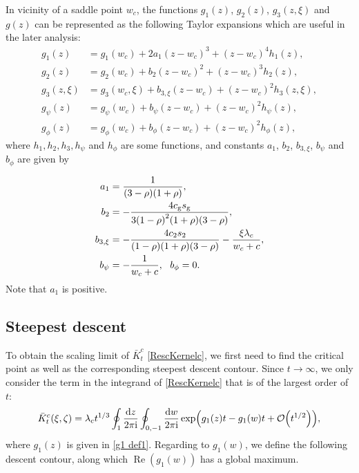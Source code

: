 \documentclass[cmp]{svjour}
\numberwithin{theorem}{section}
\numberwithin{equation}{section}
\def\ii{{\rm i}}
\DeclareMathOperator{\R}{Re}
\begin{document}
In vicinity of a saddle point $w_c$, the functions $g_1(z)$, $g_2(z)$, $g_3(z, \xi)$ and $g(z)$ can be represented as the following Taylor expansions which are useful in the later analysis: 
\begin{subequations}\label{gExpands}
	\begin{align}
		g_1(z) &= g_1(w_c) + 2 a_1 {(z - w_c)}^3 + {(z - w_c)}^4 h_1(z), \label{g1Expand} \\
		g_2(z) & = g_2(w_c) + b_2 {(z - w_c)}^2 + {(z - w_c)}^3 h_2(z), \\
		g_3(z , \xi) & = g_3(w_c , \xi) + b_{3,\xi} {(z - w_c)} + {(z - w_c)}^2 h_3(z, \xi), \\
		g_{\psi}(z) & = g_{\psi}(w_c) + b_{\psi} (z - w_c) + {(z - w_c)}^2 h_{\psi}(z),\\
		g_{\phi}(z) & = g_{\phi}(w_c) + b_{\phi} (z - w_c) + {(z - w_c)}^2 h_{\phi}(z),
	\end{align}
\end{subequations}
where $h_1,h_2,h_3,h_{\psi}$ and $h_{\phi}$ are some functions, and constants $a_1$, $b_2$, $b_{3,\xi}$, $b_{\psi}$ and $b_{\phi}$ are given by

\begin{subequations}\label{gCoefs}
	\begin{align}
		a_1 &= \frac{1}{(3 - \rho)(1 + \rho)}, \label{Defa1} \\
		b_2 &= - \frac{4 c_{\rm g} s_{\rm g}}{3 {(1 - \rho)}^2 (1 + \rho) (3 - \rho) }, \\
		b_{3,\xi} &= - \frac{4 c_2 s_2}{(1 - \rho)(1 + \rho)(3 - \rho)} - \frac{\xi\lambda_c}{w_c+c}, \\
		b_{\psi} &= - \frac{1 }{w_c + c},
		\,\,\,\,
		b_{\phi}=0.
	\end{align}
\end{subequations}
Note that $a_1$ is positive.


\subsection{Steepest descent}\label{Sec:SteepestDesecnt}

To obtain the scaling limit of $\bar{K}^c_t$ \eqref{RescKernelc}, we first need to find the critical point as well as the corresponding steepest descent contour. Since $t\rightarrow\infty$, we only consider the term in the integrand of \eqref{RescKernelc} that is of the largest order of $t$:
\[\bar{K}_t^c(\xi,\zeta)=\lambda_c t^{1/3}
\oint_1 \frac{\mathrm{d} z}{2 \pi \ii}
\oint_{0,-1} \frac{\mathrm{d} w}{2 \pi \ii}
\exp(g_1(z)t - g_1(w)t+\order{t^{1/2}}),\]
where $g_1(z)$ is given in \eqref{g1 def1}. Regarding to $g_1(w)$, we define the following descent contour, along which $\R(g_1(w))$ has a global maximum.
\end{document}
